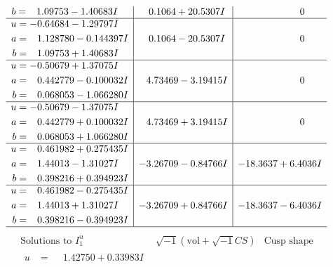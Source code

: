 \documentclass[1p]{elsarticle_modified}
\theoremstyle{definition}
\newcommand{\I}{\sqrt{-1}}
\begin{document}
$$\begin{array}{c|c|c}
\begin{aligned}
b &= \phantom{-}1.09753 - 1.40683 I\end{aligned}
 & \phantom{-}0.1064 + 20.5307 I & \phantom{-0.000000 } 0 \\ \hline\begin{aligned}
u &= -0.64684 - 1.29797 I \\
a &= \phantom{-}1.128780 - 0.144397 I \\
b &= \phantom{-}1.09753 + 1.40683 I\end{aligned}
 & \phantom{-}0.1064 - 20.5307 I & \phantom{-0.000000 } 0 \\ \hline\begin{aligned}
u &= -0.50679 + 1.37075 I \\
a &= \phantom{-}0.442779 - 0.100032 I \\
b &= \phantom{-}0.068053 - 1.066280 I\end{aligned}
 & \phantom{-}4.73469 - 3.19415 I & \phantom{-0.000000 } 0 \\ \hline\begin{aligned}
u &= -0.50679 - 1.37075 I \\
a &= \phantom{-}0.442779 + 0.100032 I \\
b &= \phantom{-}0.068053 + 1.066280 I\end{aligned}
 & \phantom{-}4.73469 + 3.19415 I & \phantom{-0.000000 } 0 \\ \hline\begin{aligned}
u &= \phantom{-}0.461982 + 0.275435 I \\
a &= \phantom{-}1.44013 - 1.31027 I \\
b &= \phantom{-}0.398216 + 0.394923 I\end{aligned}
 & -3.26709 - 0.84766 I & -18.3637 + 6.4036 I \\ \hline\begin{aligned}
u &= \phantom{-}0.461982 - 0.275435 I \\
a &= \phantom{-}1.44013 + 1.31027 I \\
b &= \phantom{-}0.398216 - 0.394923 I\end{aligned}
 & -3.26709 + 0.84766 I & -18.3637 - 6.4036 I\\
 \hline 
 \end{array}$$\newpage$$\begin{array}{c|c|c}  
\text{Solutions to }I^u_{1}& \I (\text{vol} + \sqrt{-1}CS) & \text{Cusp shape}\\
 \hline 
\begin{aligned}
u &= \phantom{-}1.42750 + 0.33983 I \\

\end{aligned}
\end{array}$$
\end{document}
